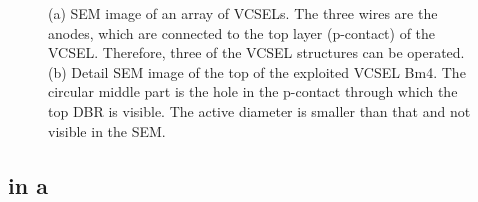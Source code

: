 \begin{figure}[tp]
\begin{subfigure}[t]{ 0.49\linewidth}
{}			\caption{}
			\label{subfig::vcsel_sem_detail}
		\end{subfigure}
		\caption{(a) SEM image of an array of VCSELs. The three wires are the anodes, which are connected to the top layer (p-contact) of the VCSEL. Therefore, three of the VCSEL structures can be operated. (b) Detail SEM image of the top of the exploited VCSEL Bm4. The circular middle part is the hole in the p-contact through which the top DBR is visible. The active diameter is smaller than that and not visible in the SEM.}
	\end{figure}

	\subsection{\siv in a \Vcsel}



